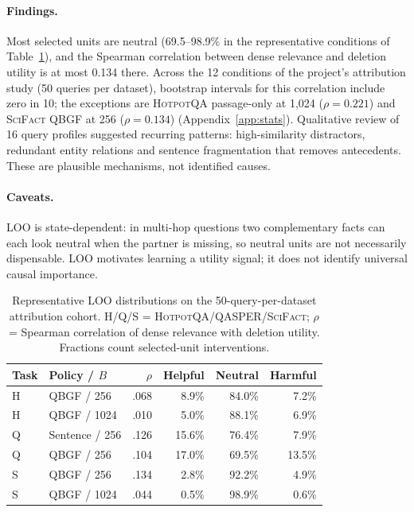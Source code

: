 \documentclass[10pt,twocolumn,letterpaper]{article}
\newcommand{\hotpot}{\textsc{HotpotQA}\xspace}
\newcommand{\qasper}{\textsc{QASPER}\xspace}
\newcommand{\scifact}{\textsc{SciFact}\xspace}
\newcommand{\SmallTable}{\footnotesize\setlength{\tabcolsep}{3.6pt}}
\begin{document}
\paragraph{Findings.} Most selected units are neutral (69.5--98.9\% in the representative conditions of Table~\ref{tab:loo}), and the Spearman correlation between dense relevance and deletion utility is at most 0.134 there. Across the 12 conditions of the project's attribution study (50 queries per dataset), bootstrap intervals for this correlation include zero in 10; the exceptions are \hotpot passage-only at 1,024 ($\rho{=}0.221$) and \scifact QBGF at 256 ($\rho{=}0.134$) (Appendix~\ref{app:stats}). Qualitative review of 16 query profiles suggested recurring patterns: high-similarity distractors, redundant entity relations and sentence fragmentation that removes antecedents. These are plausible mechanisms, not identified causes.

\paragraph{Caveats.} LOO is state-dependent: in multi-hop questions two complementary facts can each look neutral when the partner is missing, so neutral units are not necessarily dispensable. LOO motivates learning a utility signal; it does not identify universal causal importance.

\begin{table}[t]\centering\SmallTable
\caption{Representative LOO distributions on the 50-query-per-dataset attribution cohort. H/Q/S = \hotpot/\qasper/\scifact; $\rho$ = Spearman correlation of dense relevance with deletion utility. Fractions count selected-unit interventions.}\label{tab:loo}
\begin{tabular}{llrrrr}\toprule
Task & Policy / $B$ & $\rho$ & Helpful & Neutral & Harmful\\\midrule
H & QBGF / 256 & .068 & 8.9\% & 84.0\% & 7.2\%\\
H & QBGF / 1024 & .010 & 5.0\% & 88.1\% & 6.9\%\\
Q & Sentence / 256 & .126 & 15.6\% & 76.4\% & 7.9\%\\
Q & QBGF / 256 & .104 & 17.0\% & 69.5\% & 13.5\%\\
S & QBGF / 256 & .134 & 2.8\% & 92.2\% & 4.9\%\\
S & QBGF / 1024 & .044 & 0.5\% & 98.9\% & 0.6\%\\\bottomrule
\end{tabular}\end{table}
\end{document}
